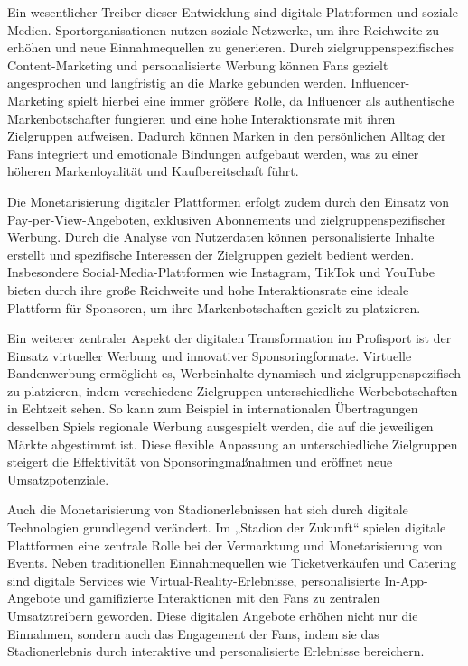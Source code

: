 \documentclass[
  number]{elsarticle}
\begin{document}
Ein wesentlicher Treiber dieser Entwicklung sind digitale Plattformen
und soziale Medien. Sportorganisationen nutzen soziale Netzwerke, um
ihre Reichweite zu erhöhen und neue Einnahmequellen zu generieren. Durch
zielgruppenspezifisches Content-Marketing und personalisierte Werbung
können Fans gezielt angesprochen und langfristig an die Marke gebunden
werden. Influencer-Marketing spielt hierbei eine immer größere Rolle, da
Influencer als authentische Markenbotschafter fungieren und eine hohe
Interaktionsrate mit ihren Zielgruppen aufweisen. Dadurch können Marken
in den persönlichen Alltag der Fans integriert und emotionale Bindungen
aufgebaut werden, was zu einer höheren Markenloyalität und
Kaufbereitschaft führt. \citep[pp.~8-10]{Stewen_Influencermarketing}

Die Monetarisierung digitaler Plattformen erfolgt zudem durch den
Einsatz von Pay-per-View-Angeboten, exklusiven Abonnements und
zielgruppenspezifischer Werbung. Durch die Analyse von Nutzerdaten
können personalisierte Inhalte erstellt und spezifische Interessen der
Zielgruppen gezielt bedient werden. Insbesondere
Social-Media-Plattformen wie Instagram, TikTok und YouTube bieten durch
ihre große Reichweite und hohe Interaktionsrate eine ideale Plattform
für Sponsoren, um ihre Markenbotschaften gezielt zu platzieren.
\citep[pp.~31-34]{Stewen_Influencermarketing}

Ein weiterer zentraler Aspekt der digitalen Transformation im Profisport
ist der Einsatz virtueller Werbung und innovativer Sponsoringformate.
Virtuelle Bandenwerbung ermöglicht es, Werbeinhalte dynamisch und
zielgruppenspezifisch zu platzieren, indem verschiedene Zielgruppen
unterschiedliche Werbebotschaften in Echtzeit sehen. So kann zum
Beispiel in internationalen Übertragungen desselben Spiels regionale
Werbung ausgespielt werden, die auf die jeweiligen Märkte abgestimmt
ist. Diese flexible Anpassung an unterschiedliche Zielgruppen steigert
die Effektivität von Sponsoringmaßnahmen und eröffnet neue
Umsatzpotenziale. \citep[pp.~15-18]{Schüler_Bandenwerbung}

Auch die Monetarisierung von Stadionerlebnissen hat sich durch digitale
Technologien grundlegend verändert. Im „Stadion der Zukunft`` spielen
digitale Plattformen eine zentrale Rolle bei der Vermarktung und
Monetarisierung von Events. Neben traditionellen Einnahmequellen wie
Ticketverkäufen und Catering sind digitale Services wie
Virtual-Reality-Erlebnisse, personalisierte In-App-Angebote und
gamifizierte Interaktionen mit den Fans zu zentralen Umsatztreibern
geworden. Diese digitalen Angebote erhöhen nicht nur die Einnahmen,
sondern auch das Engagement der Fans, indem sie das Stadionerlebnis
durch interaktive und personalisierte Erlebnisse bereichern.
\citep[pp.~29-39]{Tobeck_Stadion}
\end{document}
